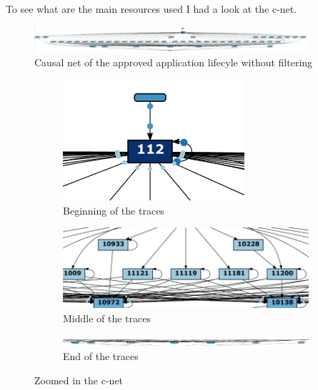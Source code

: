 To see what are the main resources used I had a look at the c-net.
\begin{figure}[!htbp]
\centering
\includegraphics[width = 0.9\textwidth]{ApprovCnet.PNG}
\caption{Causal net of the approved application lifecyle without filtering}
\label{fig:CnetApprov}
\end{figure}

\begin{figure}[!htbp]
\centering
\begin{subfigure}{0.4\textwidth}
\includegraphics[width = 0.9\linewidth]{ApprovCnetBeginning.PNG}
\caption{Beginning of the traces}
\label{fig: CnetApprovBeg}
\end{subfigure}
\begin{subfigure}{0.4\textwidth}
\includegraphics[width = 0.9\linewidth]{ApprovCnetMiddle.PNG}
\caption{Middle of the traces}
\label{fig: CnetApprovMid}
\end{subfigure}
\begin{subfigure}{0.9\textwidth}
\includegraphics[width = 0.9\linewidth]{ApprovCnetEnd.PNG}
\caption{End of the traces}
\label{fig: CnetApprovEnd}
\end{subfigure}
\caption{Zoomed in the c-net}
\label{fig:CnetApprovZoome}
\end{figure}

